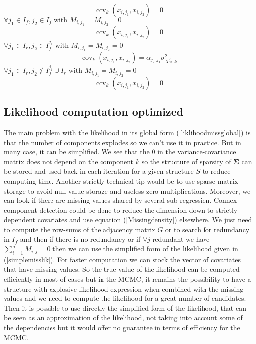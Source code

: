 \documentclass[12pt,a4paper]{report}
\begin{document}
	\begin{equation}
	\operatorname{cov}_{k}(x_{i,j_1},x_{i,j_2})=0
\end{equation}
	$\forall j_1 \in I_f, j_2 \in I_f \textrm{ with } M_{i,j_1}=M_{i,j_2}=0$
	\begin{equation}
	\operatorname{cov}_{k}(x_{i,j_1},x_{i,j_2})=0
\end{equation}
	$\forall j_1 \in I_r, j_2 \in I_f^{j_1} \textrm{ with } M_{i,j_1}=M_{i,j_2}=0$
	\begin{equation}
	\operatorname{cov}_{k}(x_{i,j_1},x_{i,j_2})= \alpha_{j_2,j_1}\sigma_{X^{j_2},k}^2
\end{equation}
$\forall j_1 \in I_r, j_2 \notin I_f^{j_1}\cup I_r \textrm{ with } M_{i,j_1}=M_{i,j_2}=0$
	\begin{equation}
	\operatorname{cov}_{k}(x_{i,j_1},x_{i,j_2})= 0
\end{equation}
	\subsection{Likelihood computation optimized}
	The main problem with the likelihood in its global form (\ref{liklihoodmissglobal}) is that the number of components explodes so we can't use it in practice. But in many case, it can be simplified.
We see that the $0$ in the variance-covariance matrix does not depend on the component $k$ so the structure of sparsity of $\boldsymbol{\Sigma}$ can be stored and used back in each iteration for a given structure $S$ to reduce computing time.  Another strictly technical tip would be to use sparse matrix storage to avoid null value storage and useless zero multiplications.
		Moreover, we can look if there are missing values shared by several sub-regression. 
		Connex component detection could be done to reduce the dimension down to strictly dependent covariates and use equation (\ref{Missingdensity}) elsewhere.
		We just need to compute the  row-sums of the adjacency matrix $G$ or to search for redundancy in $I_f$ and then if there is no redundancy or if $\forall j$ redundant we have $\sum_{i=1}^nM_{i,j}=0$ then we can use the simplified form of the likelihood given in (\ref{simplemisslik}). For faster computation we can stock the vector of covariates that have missing values.
		So the true value of the likelihood can be computed efficiently in most of cases but in the MCMC, it remains the possibility to have a structure with explosive likelihood expression when combined with the missing values and we need to compute the likelihood for a great number of candidates. Then it is possible to use directly the simplified form of the likelihood, that can be seen as an approximation of the likelihood, not taking into account some of the dependencies but it would offer no guarantee in terms of efficiency for the MCMC. %
\end{document}
